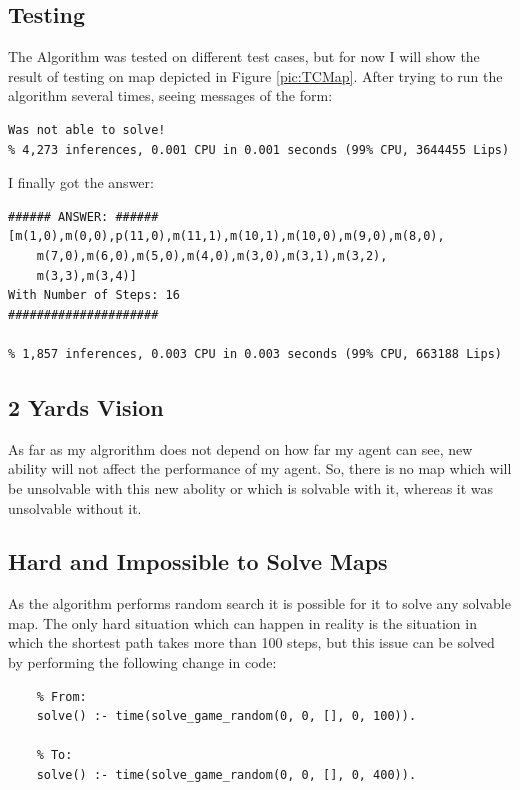 \documentclass[a4apper,11pt]{article}
\begin{document}
\subsection{Testing}
The Algorithm was tested on different test cases, but for now I will show the result of testing on map depicted in Figure \ref{pic:TCMap}.
After trying to run the algorithm several times, seeing messages of the form:
\begin{lstlisting}
Was not able to solve!
% 4,273 inferences, 0.001 CPU in 0.001 seconds (99% CPU, 3644455 Lips)
\end{lstlisting}

\noindent I finally got the answer:
\begin{lstlisting}
###### ANSWER: ######
[m(1,0),m(0,0),p(11,0),m(11,1),m(10,1),m(10,0),m(9,0),m(8,0),
    m(7,0),m(6,0),m(5,0),m(4,0),m(3,0),m(3,1),m(3,2),
    m(3,3),m(3,4)]
With Number of Steps: 16
#####################

% 1,857 inferences, 0.003 CPU in 0.003 seconds (99% CPU, 663188 Lips)    
\end{lstlisting}

\subsection{2 Yards Vision}
As far as my algrorithm does not depend on how far my agent can see, new ability will not affect the performance of my agent. So, there is no map which will be unsolvable with this new abolity or which is solvable with it, whereas it was unsolvable without it.

\subsection{Hard and Impossible to Solve Maps}
As the algorithm performs random search it is possible for it to solve any solvable map. The only hard situation which can happen in reality is the situation in which the shortest path takes more than 100 steps, but this issue can be solved by performing the following change in code:

\begin{lstlisting}
    % From:
    solve() :- time(solve_game_random(0, 0, [], 0, 100)).

    % To:
    solve() :- time(solve_game_random(0, 0, [], 0, 400)).
\end{lstlisting}
\end{document}
